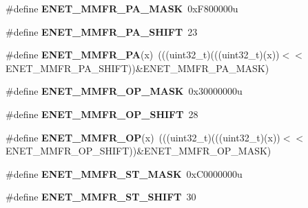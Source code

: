 \begin{DoxyCompactItemize}
\item 
\#define {\bfseries E\+N\+E\+T\+\_\+\+M\+M\+F\+R\+\_\+\+P\+A\+\_\+\+M\+A\+SK}~0x\+F800000u\hypertarget{group__ENET__Register__Masks_ga94bdc2ca69bff166783ef7c044c025b4}{}\label{group__ENET__Register__Masks_ga94bdc2ca69bff166783ef7c044c025b4}

\item 
\#define {\bfseries E\+N\+E\+T\+\_\+\+M\+M\+F\+R\+\_\+\+P\+A\+\_\+\+S\+H\+I\+FT}~23\hypertarget{group__ENET__Register__Masks_gaf0551254f9579ac5acce7a3d8d22d808}{}\label{group__ENET__Register__Masks_gaf0551254f9579ac5acce7a3d8d22d808}

\item 
\#define {\bfseries E\+N\+E\+T\+\_\+\+M\+M\+F\+R\+\_\+\+PA}(x)~(((uint32\+\_\+t)(((uint32\+\_\+t)(x))$<$$<$E\+N\+E\+T\+\_\+\+M\+M\+F\+R\+\_\+\+P\+A\+\_\+\+S\+H\+I\+FT))\&E\+N\+E\+T\+\_\+\+M\+M\+F\+R\+\_\+\+P\+A\+\_\+\+M\+A\+SK)\hypertarget{group__ENET__Register__Masks_gabc1d7007e1d9cee9e24f31a8c289f375}{}\label{group__ENET__Register__Masks_gabc1d7007e1d9cee9e24f31a8c289f375}

\item 
\#define {\bfseries E\+N\+E\+T\+\_\+\+M\+M\+F\+R\+\_\+\+O\+P\+\_\+\+M\+A\+SK}~0x30000000u\hypertarget{group__ENET__Register__Masks_ga90049372c88bf3a759aecb3b9ab7208d}{}\label{group__ENET__Register__Masks_ga90049372c88bf3a759aecb3b9ab7208d}

\item 
\#define {\bfseries E\+N\+E\+T\+\_\+\+M\+M\+F\+R\+\_\+\+O\+P\+\_\+\+S\+H\+I\+FT}~28\hypertarget{group__ENET__Register__Masks_ga6c7887926bc9935d7fd783894fb4a34c}{}\label{group__ENET__Register__Masks_ga6c7887926bc9935d7fd783894fb4a34c}

\item 
\#define {\bfseries E\+N\+E\+T\+\_\+\+M\+M\+F\+R\+\_\+\+OP}(x)~(((uint32\+\_\+t)(((uint32\+\_\+t)(x))$<$$<$E\+N\+E\+T\+\_\+\+M\+M\+F\+R\+\_\+\+O\+P\+\_\+\+S\+H\+I\+FT))\&E\+N\+E\+T\+\_\+\+M\+M\+F\+R\+\_\+\+O\+P\+\_\+\+M\+A\+SK)\hypertarget{group__ENET__Register__Masks_gac00d5a828e48d9012aacde18087a622c}{}\label{group__ENET__Register__Masks_gac00d5a828e48d9012aacde18087a622c}

\item 
\#define {\bfseries E\+N\+E\+T\+\_\+\+M\+M\+F\+R\+\_\+\+S\+T\+\_\+\+M\+A\+SK}~0x\+C0000000u\hypertarget{group__ENET__Register__Masks_ga98ea3eee6cc1ad4be4cd471b4adfd876}{}\label{group__ENET__Register__Masks_ga98ea3eee6cc1ad4be4cd471b4adfd876}

\item 
\#define {\bfseries E\+N\+E\+T\+\_\+\+M\+M\+F\+R\+\_\+\+S\+T\+\_\+\+S\+H\+I\+FT}~30\hypertarget{group__ENET__Register__Masks_gabff166a3d09c782f336fac767d5ab5ab}{}\label{group__ENET__Register__Masks_gabff166a3d09c782f336fac767d5ab5ab}


\end{DoxyCompactItemize}
